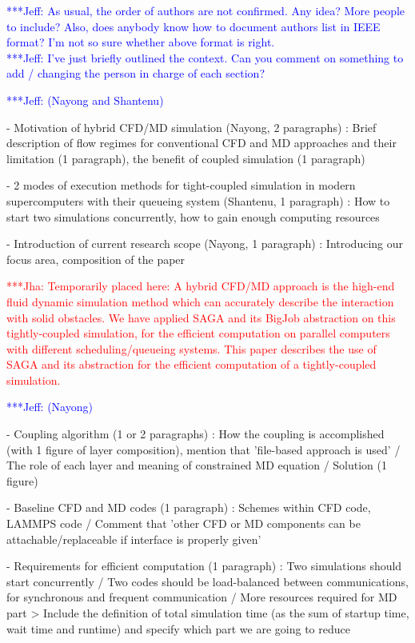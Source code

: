 \documentclass[times, 10pt,twocolumn]{article}
\newcommand{\jhanote}[1]{ {\textcolor{red} { ***Jha: #1 }}}
\newcommand{\skonote}[1]{ {\textcolor{blue} { ***Jeff: #1 }}}
\newcommand{\jhanote}[1]{}
\newcommand{\skonote}[1]{}
\begin{document}
\skonote{As usual, the order of authors are not confirmed. Any idea? More people to include? Also, does anybody know how to document authors list in IEEE format? I'm not so sure whether above format is right.}\\
\skonote{I've just briefly outlined the context. Can you comment on something to add / changing the person in charge of each section?}

\skonote{(Nayong and Shantenu)}

- Motivation of hybrid CFD/MD simulation (Nayong, 2 paragraphs)
: Brief description of flow regimes for conventional CFD and MD approaches and their limitation (1 paragraph), the benefit of coupled simulation (1 paragraph)

- 2 modes of execution methods for tight-coupled simulation in modern supercomputers with their queueing system (Shantenu, 1 paragraph)
: How to start two simulations concurrently, how to gain enough computing resources

- Introduction of current research scope (Nayong, 1 paragraph)
: Introducing our focus area, composition of the paper

\jhanote{Temporarily placed here: A hybrid CFD/MD approach is the high-end fluid dynamic simulation method which can accurately describe the interaction with solid obstacles. We have applied SAGA and its BigJob abstraction on this tightly-coupled simulation, for the efficient computation on parallel computers with different scheduling/queueing systems. This paper describes the use of SAGA and its abstraction for the efficient computation of a tightly-coupled simulation.}

\skonote{(Nayong)}

- Coupling algorithm (1 or 2 paragraphs)
: How the coupling is accomplished (with 1 figure of layer composition), mention that 'file-based approach is used' / The role of each layer and meaning of constrained MD equation / Solution (1 figure)

- Baseline CFD and MD codes (1 paragraph)
: Schemes within CFD code, LAMMPS code / Comment that 'other CFD or MD components can be attachable/replaceable if interface is properly given'

- Requirements for efficient computation (1 paragraph)
: Two simulations should start concurrently / Two codes should be load-balanced between communications, for synchronous and frequent communication / More resources required for MD part
> Include the definition of total simulation time (as the sum of startup time, wait time and runtime) and specify which part we are going to reduce
\end{document}
